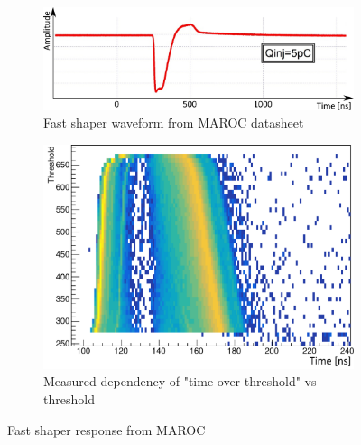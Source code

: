 \begin{figure}[hbt]
	\centering
	\begin{subfigure}{0.9\linewidth}
		\includegraphics[width=\linewidth]{figures/FastShaper_MAROC.pdf}
		\caption{Fast shaper waveform from MAROC datasheet}
		\label{fig:fastMAROC}
	\end{subfigure}
	\begin{subfigure}{0.6\linewidth}
		\includegraphics[width=\linewidth]{figures/FastWaveForm_RICH.pdf}
		\caption{Measured dependency of "time over threshold" vs threshold}
		\label{fig:fastJLab}
	\end{subfigure}
	\caption{Fast shaper response from MAROC}
	\label{fig:fastWaveform}
\end{figure}


